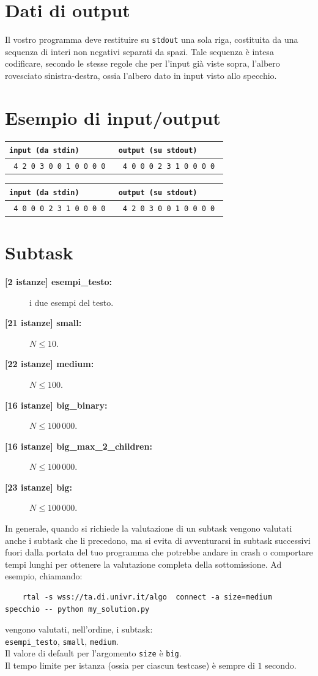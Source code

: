 \documentclass[a4paper,11pt]{article}
\newcommand{\file}[1]{\texttt{#1}}
\newcommand{\esempio}[2]{
\noindent\begin{minipage}{\textwidth}
\begin{tabular}{|p{11cm}|p{5cm}|}
	\hline
      \textbf{\file{input (da stdin)}} & \textbf{\file{output (su stdout)}}\\
	\hline
	\tt \small #1 &
	\tt \small #2 \\
	\hline
\end{tabular}
\end{minipage}
}
\begin{document}
\section*{Dati di output}

Il vostro programma deve restituire su \verb'stdout' una sola riga, costituita da una sequenza di interi non negativi separati da spazi. Tale sequenza è intesa codificare, secondo le stesse regole che per l'input già viste sopra, l'albero rovesciato sinistra-destra, ossia l'albero dato in input visto allo specchio.

\section*{Esempio di input/output}
\esempio{
4 2 0 3 0 0 1 0 0 0 0
}{
4 0 0 0 2 3 1 0 0 0 0
}

\esempio{
4 0 0 0 2 3 1 0 0 0 0
}{
4 2 0 3 0 0 1 0 0 0 0
}


\section*{Subtask}
\begin{description}
\item[\textbf{\hspace{1ex}[2 istanze] esempi\_testo:}] i due esempi del testo.
\item [\textbf{[21 istanze] small:}] $N \le 10$.
\item [\textbf{[22 istanze] medium:}] $N \le 100$.
\item [\textbf{[16 istanze] big\_binary:}] $N \le 100\,000$.
\item [\textbf{[16 istanze] big\_max\_2\_children:}] $N \le 100\,000$.
\item [\textbf{[23 istanze] big:}] $N \le 100\,000$.
\end{description}

In generale, quando si richiede la valutazione di un subtask vengono valutati anche i subtask che li precedono, ma si evita di avventurarsi in subtask successivi  fuori dalla portata del tuo programma che potrebbe andare in crash o comportare tempi lunghi per ottenere la valutazione completa della sottomissione. Ad esempio, chiamando:

\begin{verbatim}
    rtal -s wss://ta.di.univr.it/algo  connect -a size=medium  specchio -- python my_solution.py
\end{verbatim}

\noindent
vengono valutati, nell'ordine, i subtask:\\

{\tt esempi\_testo}, {\tt small}, {\tt medium}.\\

\noindent
Il valore di default per l'argomento {\tt size} è {\tt big}.\\

\noindent
Il tempo limite per istanza (ossia per ciascun testcase) è sempre di $1$ secondo.
\end{document}
